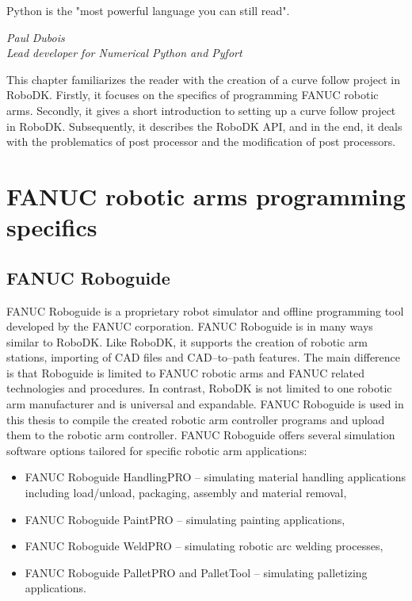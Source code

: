 \label{chap:implementation}

\epigraph{Python is the "most powerful language you can still read".}{\textit{Paul Dubois \\ Lead developer for Numerical Python and Pyfort }}

This chapter familiarizes the reader with the creation of a curve follow project in RoboDK. Firstly, it focuses on the specifics of programming FANUC robotic arms. Secondly, it gives a short introduction to setting up a curve follow project in RoboDK. Subsequently, it describes the RoboDK API, and in the end, it deals with the problematics of post processor and the modification of post processors.

\section{FANUC robotic arms programming specifics}

\subsection{FANUC Roboguide}

FANUC Roboguide is a proprietary robot simulator and offline programming tool developed by the FANUC corporation. FANUC Roboguide is in many ways similar to RoboDK.  Like RoboDK, it supports the creation of robotic arm stations, importing of CAD files and CAD--to--path features. The main difference is that Roboguide is limited to FANUC robotic arms and FANUC related technologies and procedures. In contrast, RoboDK is not limited to one robotic arm manufacturer and is universal and expandable. FANUC Roboguide is used in this thesis to compile the created robotic arm controller programs and upload them to the robotic arm controller. FANUC Roboguide offers several simulation software options tailored for specific robotic arm applications:

\begin{itemize}

\item FANUC Roboguide HandlingPRO -- simulating material handling applications including load/unload, packaging, assembly and material removal,
\item FANUC Roboguide PaintPRO -- simulating painting applications,
\item FANUC Roboguide WeldPRO -- simulating robotic arc welding processes,
\item FANUC Roboguide PalletPRO and PalletTool -- simulating palletizing applications.

\end{itemize}

